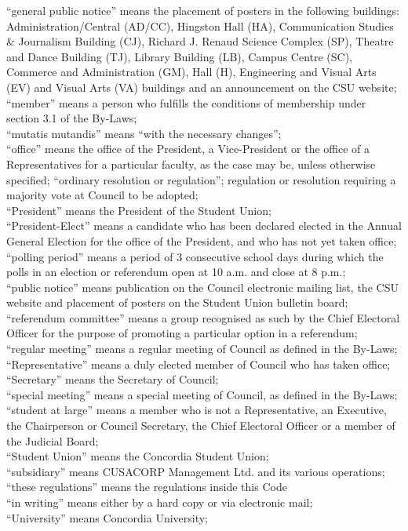 \documentclass[oneside]{book}
\begin{document}
\begin{enumerate}
``general public notice'' means the placement
of posters in the following buildings: Administration/Central (AD/CC),
Hingston Hall (HA), Communication Studies \& Journalism Building (CJ),
Richard J. Renaud Science Complex (SP), Theatre and Dance Building
(TJ), Library Building (LB), Campus Centre (SC), Commerce and Administration
(GM), Hall (H), Engineering and Visual Arts (EV) and Visual Arts (VA)
buildings and an announcement on the CSU website; \\
``member'' means a person who fulfills the
conditions of membership under section 3.1 of the By-Laws; \\
``mutatis mutandis'' means ``with
the necessary changes''; \\
``office'' means the office of the President,
a Vice-President or the office of a Representatives for a particular
faculty, as the case may be, unless otherwise specified; ``ordinary
resolution or regulation''; regulation or resolution
requiring a majority vote at Council to be adopted; \\
``President'' means the President of the
Student Union; \\
``President-Elect'' means a candidate who
has been declared elected in the Annual General Election for the office
of the President, and who has not yet taken office; \\
``polling period'' means a period of 3 consecutive
school days during which the polls in an election or referendum open
at 10 a.m. and close at 8 p.m.; \\
``public notice'' means publication on the
Council electronic mailing list, the CSU website and placement of
posters on the Student Union bulletin board; \\
``referendum committee'' means a group recognised
as such by the Chief Electoral Officer for the purpose of promoting
a particular option in a referendum; \\
``regular meeting'' means a regular meeting
of Council as defined in the By-Laws; \\
``Representative'' means a duly elected
member of Council who has taken office; \\
``Secretary'' means the Secretary of Council;
\\
``special meeting'' means a special meeting
of Council, as defined in the By-Laws; \\
``student at large'' means a member who
is not a Representative, an Executive, the Chairperson or Council
Secretary, the Chief Electoral Officer or a member of the Judicial
Board; \\
``Student Union'' means the Concordia Student
Union; \\
``subsidiary'' means CUSACORP Management
Ltd. and its various operations; \\
``these regulations'' means the regulations
inside this Code \\
``in writing'' means either by a hard copy
or via electronic mail; \\
``University'' means Concordia University; 
\setcounter{secnumdepth}{3}



\end{enumerate}
\end{document}
